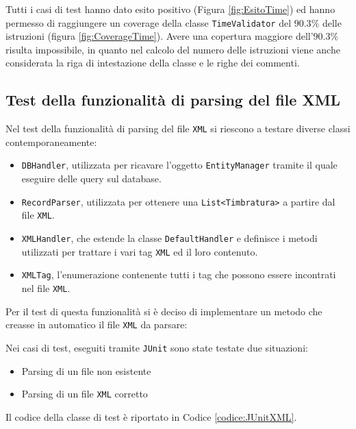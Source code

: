 
\noindent
Tutti i casi di test hanno dato esito positivo (Figura \ref{fig:EsitoTime}) ed hanno permesso di raggiungere un coverage della classe \verb|TimeValidator| del $90.3\%$ delle istruzioni (figura \ref{fig:CoverageTime}). Avere una copertura maggiore dell'$90.3\%$ risulta impossibile, in quanto nel calcolo del numero delle istruzioni viene anche considerata la riga di intestazione della classe e le righe dei commenti.
\subsection{Test della funzionalità di parsing del file XML}
Nel test della funzionalità di parsing del file \verb|XML| si riescono a testare diverse classi contemporaneamente:
\begin{itemize}
	\item \verb|DBHandler|, utilizzata per ricavare l'oggetto \verb|EntityManager| tramite il quale eseguire delle query sul database.
	\item \verb|RecordParser|, utilizzata per ottenere una \verb|List<Timbratura>| a partire dal file \verb|XML|.
	\item \verb|XMLHandler|, che estende la classe \verb|DefaultHandler| e definisce i metodi utilizzati per trattare i vari tag \verb|XML| ed il loro contenuto.
	\item \verb|XMLTag|, l'enumerazione contenente tutti i tag che possono essere incontrati nel file \verb|XML|.
\end{itemize}
Per il test di questa funzionalità si è deciso di implementare un metodo che creasse in automatico il file \verb|XML| da parsare:
\lstset{
    caption=Metodo per la creazione del file XML di test,
    label=codice:XMLTest,
 }



Nei casi di test, eseguiti tramite \verb|JUnit| sono state testate due situazioni:
\begin{itemize}
	\item Parsing di un file non esistente
	\item Parsing di un file \verb|XML| corretto
\end{itemize}
Il codice della classe di test è riportato in Codice \ref{codice:JUnitXML}.

